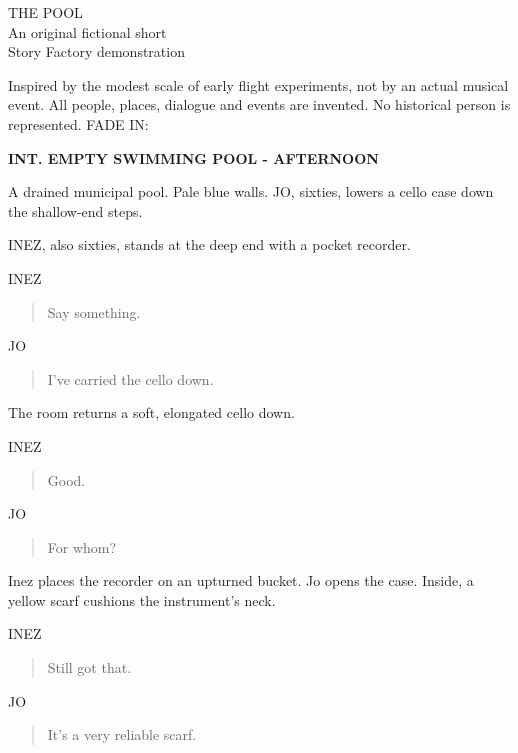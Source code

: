 \documentclass[12pt,letterpaper]{article}
\newcommand{\scene}[1]{\needspace{5\baselineskip}\vspace{8pt}\textbf{#1}\par}
\newcommand{\character}[1]{\needspace{4\baselineskip}\hspace*{2.2in}#1\par\nopagebreak}
\begin{document}
\thispagestyle{empty}
\vspace*{2in}\begin{center}THE POOL\\[18pt]An original fictional short\\[18pt]Story Factory demonstration\end{center}
\vfill\small Inspired by the modest scale of early flight experiments, not by an actual musical event. All people, places, dialogue and events are invented. No historical person is represented.\normalsize
\newpage\setcounter{page}{1}
FADE IN:\par
\scene{INT. EMPTY SWIMMING POOL - AFTERNOON}

A drained municipal pool. Pale blue walls. JO, sixties, lowers a cello case down the shallow-end steps.\par

INEZ, also sixties, stands at the deep end with a pocket recorder.\par

\character{INEZ}
\begin{quote}Say something.\par\end{quote}

\character{JO}
\begin{quote}I've carried the cello down.\par\end{quote}

The room returns a soft, elongated cello down.\par

\character{INEZ}
\begin{quote}Good.\par\end{quote}

\character{JO}
\begin{quote}For whom?\par\end{quote}

Inez places the recorder on an upturned bucket. Jo opens the case. Inside, a yellow scarf cushions the instrument's neck.\par

\character{INEZ}
\begin{quote}Still got that.\par\end{quote}

\character{JO}
\begin{quote}It's a very reliable scarf.\par\end{quote}
\end{document}
